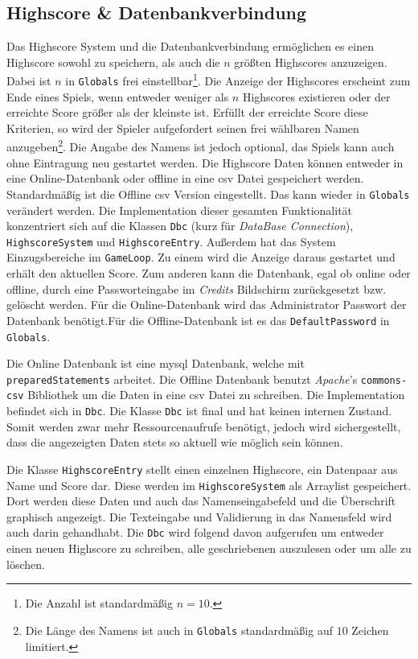 \subsection{Highscore \& Datenbankverbindung}

Das Highscore System und die Datenbankverbindung ermöglichen es einen Highscore sowohl zu speichern, als auch die $n$ größten Highscores anzuzeigen.
Dabei ist $n$ in \texttt{Globals} frei einstellbar\footnote{Die Anzahl ist standardmäßig $n=10$.}.
Die Anzeige der Highscores erscheint zum Ende eines Spiels, wenn entweder weniger als $n$ Highscores existieren oder der erreichte Score größer als der kleinste ist.
Erfüllt der erreichte Score diese Kriterien, so wird der Spieler aufgefordert seinen frei wählbaren Namen anzugeben\footnote{Die Länge des Namens ist auch in \texttt{Globals} standardmäßig auf $10$ Zeichen limitiert.}.
Die Angabe des Namens ist jedoch optional, das Spiels kann auch ohne Eintragung neu gestartet werden.
Die Highscore Daten können entweder in eine Online-Datenbank oder offline in eine \gls{csv} Datei gespeichert werden.
Standardmäßig ist die Offline \gls{csv} Version eingestellt.
Das kann wieder in \texttt{Globals} verändert werden.
Die Implementation dieser gesamten Funktionalität konzentriert sich auf die Klassen \texttt{Dbc} (kurz für \textit{DataBase Connection}), \texttt{HighscoreSystem} und \texttt{HighscoreEntry}.
Außerdem hat das System Einzugsbereiche im \texttt{GameLoop}.
Zu einem wird die Anzeige daraus gestartet und erhält den aktuellen Score.
Zum anderen kann die Datenbank, egal ob online oder offline, durch eine Passworteingabe im \textit{Credits} Bildschirm zurückgesetzt bzw. gelöscht werden.
Für die Online-Datenbank wird das Administrator Passwort der Datenbank benötigt.Für die Offline-Datenbank ist es das \texttt{DefaultPassword} in \texttt{Globals}.

Die Online Datenbank ist eine \gls{mysql} Datenbank, welche mit \texttt{preparedStatements} arbeitet.
Die Offline Datenbank benutzt \textit{Apache}'s \texttt{commons-csv} Bibliothek um die Daten in eine \gls{csv} Datei zu schreiben.
Die Implementation befindet sich in \texttt{Dbc}.
Die Klasse \texttt{Dbc} ist final und hat keinen internen Zustand.
Somit werden zwar mehr Ressourcenaufrufe benötigt, jedoch wird sichergestellt, dass die angezeigten Daten stets so aktuell wie möglich sein können.

Die Klasse \texttt{HighscoreEntry} stellt einen einzelnen Highscore, ein Datenpaar aus Name und Score dar.
Diese werden im \texttt{HighscoreSystem} als Arraylist gespeichert.
Dort werden diese Daten und auch das Namenseingabefeld und die Überschrift graphisch angezeigt.
Die Texteingabe und Validierung in das Namensfeld wird auch darin gehandhabt.
Die \texttt{Dbc} wird folgend davon aufgerufen um entweder einen neuen Highscore zu schreiben, alle geschriebenen auszulesen oder um alle zu löschen.
